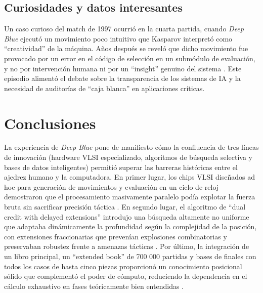 \documentclass[a4paper, 12pt]{article}
\begin{document}
\subsection{Curiosidades y datos interesantes}

Un caso curioso del match de 1997 ocurrió en la cuarta partida, 
cuando \textit{Deep Blue} ejecutó un movimiento poco intuitivo 
que Kasparov interpretó como “creatividad” de la máquina. Años 
después se reveló que dicho movimiento fue provocado por un 
error en el código de selección en un submódulo de evaluación, y 
no por intervención humana ni por un “insight” genuino del 
sistema \cite{wikideepblue,time2013}. Este episodio 
alimentó el debate sobre la transparencia de los sistemas de 
IA y la necesidad de auditorías de “caja blanca” en aplicaciones 
críticas.  




\newpage
\section{Conclusiones}


La experiencia de \textit{Deep Blue} pone de manifiesto cómo la 
confluencia de tres líneas de innovación (hardware VLSI 
especializado, algoritmos de búsqueda selectiva y bases de datos 
inteligentes) permitió superar las barreras históricas entre el 
ajedrez humano y la computadora. En primer lugar, los chips 
VLSI diseñados ad hoc para generación de movimientos y 
evaluación en un ciclo de reloj demostraron que el procesamiento 
masivamente paralelo podía explotar la fuerza bruta sin 
sacrificar precisión táctica \cite{campbell2002deep}\cite{turn0search10}. 
En segundo lugar, el algoritmo de “dual credit with delayed 
extensions” introdujo una búsqueda altamente no uniforme que 
adaptaba dinámicamente la profundidad según la complejidad de 
la posición, con extensiones fraccionarias que prevenían 
explosiones combinatorias y preservaban robustez frente a 
amenazas tácticas \cite{turn0search3}. Por último, la 
integración de un libro principal, un “extended book” de 700 000 
partidas y bases de finales con todos los casos de hasta cinco 
piezas proporcionó un conocimiento posicional sólido que 
complementó el poder de cómputo, reduciendo la dependencia en 
el cálculo exhaustivo en fases teóricamente bien entendidas 
\cite{turn0search2}\cite{turn0search4}.
\end{document}
